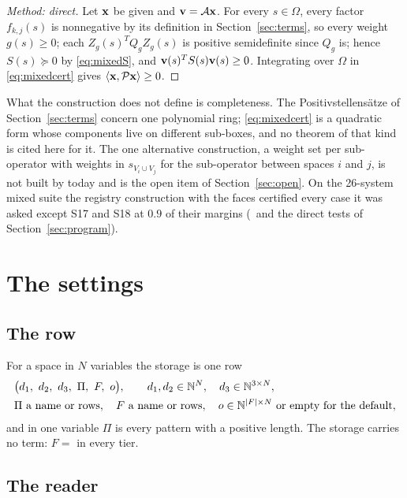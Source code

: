 \begin{proof}[Method: direct]
Let $\mathbf{x}$ be given and $\mathbf{v}=\mathcal{A}\mathbf{x}$. For every $s\in\Omega$, every factor $f_{k,j}(s)$ is nonnegative by its definition in Section~\ref{sec:terms}, so every weight $g(s)\ge0$; each $Z_g(s)^TQ_gZ_g(s)$ is positive semidefinite since $Q_g$ is; hence $S(s)\succeq0$ by \eqref{eq:mixedS}, and $\mathbf{v}(s)^TS(s)\mathbf{v}(s)\ge0$. Integrating over $\Omega$ in \eqref{eq:mixedcert} gives $\left\langle \mathbf{x},\mathcal{P}\mathbf{x}\right\rangle\ge0$.
\end{proof}

What the construction does not define is completeness. The Positivstellens\"atze of Section~\ref{sec:terms} concern one polynomial ring; \eqref{eq:mixedcert} is a quadratic form whose components live on different sub-boxes, and no theorem of that kind is cited here for it. The one alternative construction, a weight set per sub-operator with weights in $s_{V_i\cup V_j}$ for the sub-operator between spaces $i$ and $j$, is not built by  today and is the open item of Section~\ref{sec:open}. On the 26-system mixed suite the registry construction with the faces certified every case it was asked except S17 and S18 at $0.9$ of their margins (\liftref\ and the direct tests of Section~\ref{sec:program}).

\section{The settings}\label{sec:settings}

\subsection{The row}

For a space in $N$ variables the storage is one row
\[
\begin{aligned}
&\bigl(d_1,\ d_2,\ d_3,\ \Pi,\ F,\ o\bigr),\qquad d_1,d_2\in\mathbb{N}^N,\quad d_3\in\mathbb{N}^{3\times N},\\
&\Pi\ \text{a name or rows},\quad F\ \text{a name or rows},\quad o\in\mathbb{N}^{|F|\times N}\ \text{or empty for the default},
\end{aligned}
\]
and in one variable $\Pi$ is every pattern with a positive length. The storage carries no term: $F=$  in every tier.



\subsection{The reader}\label{sec:reader}

